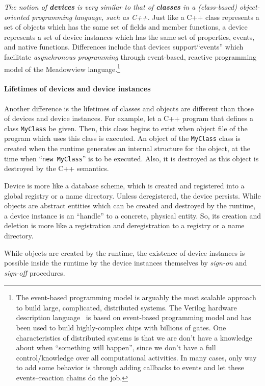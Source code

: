 \documentclass{note}
\begin{document}
\textcolor{red2}{\em The notion of {\bf\em devices} is very similar to that of {\bf\em classes\/} in a
(class-based) object-oriented programming language, such as C++. \/}
Just like a C++ class represents a set of objects which has the same set of
fields and member functions, a device represents a set of device instances
which has the same set of properties, events, and native functions.
Differences include that devices support``events'' which facilitate
{\em asynchronous programming\/} through event-based, reactive programming
model of the Meadowview language.\footnote{The event-based programming model is
  arguably the most scalable approach to build large, complicated, distributed
  systems. The Verilog hardware description language~\cite{Verilog2001} is based on event-based
  programming model and has been used to build highly-complex chips with
  billions of gates. One characteristics of distributed systems is that we are
  don't have a knowledge about when ``something will happen'', since we don't
  have a full control/knowledge over all computational activities. In many
  cases, only way to add some behavior is through adding callbacks to events
  and let these events--reaction chains do the job.}

\paragraph{\small\bf{}Lifetimes of devices and device instances}
Another difference is the lifetimes of classes and objects are different than
those of devices and device instances. For example, let a C++ program that
defines a class \verb+MyClass+ be given. Then, this class begins to exist when
object file of the program which uses this class is executed. An object of
the \verb+MyClass+ class is created when the runtime generates an internal
structure for the object, at the time when ``\verb+new MyClass+'' is to be
executed. Also, it is destroyed as this object is destroyed by the C++
semantics. 

Device is more like a database scheme, which is created and registered into 
a global registry or a name directory. Unless deregistered, the device
persists. 
While objects are abstract entities which can be
created and destroyed by the runtime, a device instance is an ``handle'' to a
concrete, physical entity. So, its creation and deletion is more like a
registration and deregistration to a registry or a name directory.


While objects are created by the runtime, the existence of device instances is 
possible inside the runtime by the device instances themselves by {\em
  sign-on\/} and {\em sign-off} procedures. 
\end{document}
